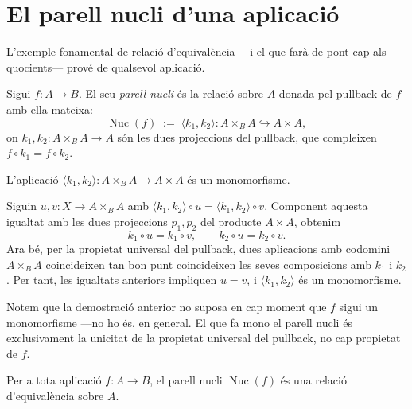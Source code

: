 \section{El parell nucli d'una aplicació}\label{sec:kernel-pair}

L'exemple fonamental de relació d'equivalència ---i el que farà de pont cap als quocients--- prové de qualsevol aplicació.

\begin{definicio}\label{def:kernel-pair}
Sigui \(f\colon A\to B\). El seu \emph{parell nucli} és la relació sobre \(A\) donada pel pullback de \(f\) amb ella mateixa:
\[
\operatorname{Nuc}(f)\;:=\;\langle k_1,k_2\rangle\colon A\times_B A\hookrightarrow A\times A,
\]
on \(k_1,k_2\colon A\times_B A\to A\) són les dues projeccions del pullback, que compleixen \(f\circ k_1=f\circ k_2\).
\end{definicio}

\begin{proposicio}\label{prop:kernel-mono}
L'aplicació \(\langle k_1,k_2\rangle\colon A\times_B A\to A\times A\) és un monomorfisme.
\end{proposicio}

\begin{prova}
Siguin \(u,v\colon X\to A\times_B A\) amb \(\langle k_1,k_2\rangle\circ u=\langle k_1,k_2\rangle\circ v\). Component aquesta igualtat amb les dues projeccions \(p_1,p_2\) del producte \(A\times A\), obtenim
\[
k_1\circ u=k_1\circ v,
\qquad
k_2\circ u=k_2\circ v.
\]
Ara bé, per la propietat universal del pullback, dues aplicacions amb codomini \(A\times_B A\) coincideixen tan bon punt coincideixen les seves composicions amb \(k_1\) i \(k_2\). Per tant, les igualtats anteriors impliquen \(u=v\), i \(\langle k_1,k_2\rangle\) és un monomorfisme.
\end{prova}

\begin{observacio}\label{obs:kernel-no-mono}
Notem que la demostració anterior no suposa en cap moment que \(f\) sigui un monomorfisme ---no ho és, en general. El que fa mono el parell nucli és exclusivament la unicitat de la propietat universal del pullback, no cap propietat de \(f\).
\end{observacio}

\begin{proposicio}\label{prop:kernel-equivalencia}
Per a tota aplicació \(f\colon A\to B\), el parell nucli \(\operatorname{Nuc}(f)\) és una relació d'equivalència sobre \(A\).
\end{proposicio}


